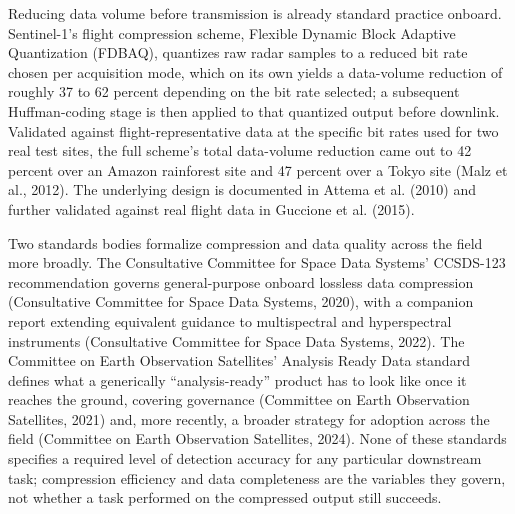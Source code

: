 \documentclass[11pt]{article}
\begin{document}
Reducing data volume before transmission is already standard practice onboard. Sentinel-1's flight compression scheme, Flexible Dynamic Block Adaptive Quantization (FDBAQ), quantizes raw radar samples to a reduced bit rate chosen per acquisition mode, which on its own yields a data-volume reduction of roughly 37 to 62 percent depending on the bit rate selected; a subsequent Huffman-coding stage is then applied to that quantized output before downlink. Validated against flight-representative data at the specific bit rates used for two real test sites, the full scheme's total data-volume reduction came out to 42 percent over an Amazon rainforest site and 47 percent over a Tokyo site (Malz et al., 2012). The underlying design is documented in Attema et al. (2010) and further validated against real flight data in Guccione et al. (2015).

Two standards bodies formalize compression and data quality across the field more broadly. The Consultative Committee for Space Data Systems' CCSDS-123 recommendation governs general-purpose onboard lossless data compression (Consultative Committee for Space Data Systems, 2020), with a companion report extending equivalent guidance to multispectral and hyperspectral instruments (Consultative Committee for Space Data Systems, 2022). The Committee on Earth Observation Satellites' Analysis Ready Data standard defines what a generically ``analysis-ready'' product has to look like once it reaches the ground, covering governance (Committee on Earth Observation Satellites, 2021) and, more recently, a broader strategy for adoption across the field (Committee on Earth Observation Satellites, 2024). None of these standards specifies a required level of detection accuracy for any particular downstream task; compression efficiency and data completeness are the variables they govern, not whether a task performed on the compressed output still succeeds.
\end{document}
